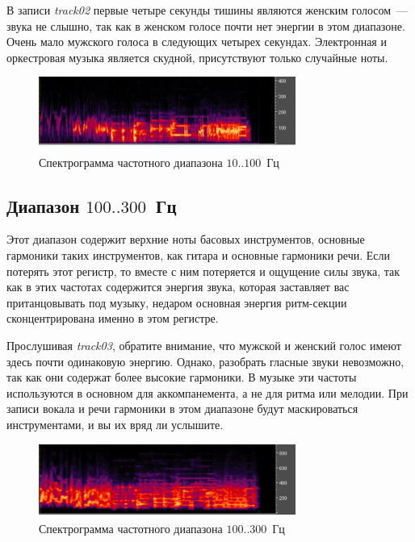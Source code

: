 \documentclass[oneside, final, 14pt]{extreport}
\begin{document}
В записи \emph{track02} первые четыре секунды тишины являются женским голосом~--- звука не слышно, так как в женском голосе почти нет энергии в этом диапазоне. Очень мало мужского голоса в следующих четырех секундах. Электронная и оркестровая музыка является скудной, присутствуют только случайные ноты.

\begin{figure}[h]
  \centering
  \includegraphics[width=0.75\textwidth]{pic-specter-01}
  \caption{Спектрограмма частотного диапазона $10..100$~Гц}
  \label{pic-specter-01}
\end{figure}

\subsection{Диапазон $100..300$~Гц}
Этот диапазон содержит верхние ноты басовых инструментов, основные гармоники таких инструментов, как гитара и основные гармоники речи. Если потерять этот регистр, то вместе с ним потеряется и ощущение силы звука, так как в этих частотах содержится энергия звука, которая заставляет вас пританцовывать под музыку, недаром основная энергия ритм-секции сконцентрирована именно в этом регистре.

Прослушивая \emph{track03}, обратите внимание, что мужской и женский голос имеют здесь почти одинаковую энергию. Однако, разобрать гласные звуки невозможно, так как они содержат более высокие гармоники. В музыке эти частоты используются в основном для аккомпанемента, а не для ритма или мелодии. При записи вокала и речи гармоники в этом диапазоне будут маскироваться инструментами, и вы их вряд ли услышите.

\begin{figure}[h]
  \centering
  \includegraphics[width=0.75\textwidth]{pic-specter-02}
  \caption{Спектрограмма частотного диапазона $100..300$~Гц}
  \label{pic-specter-02}
\end{figure}
\end{document}
